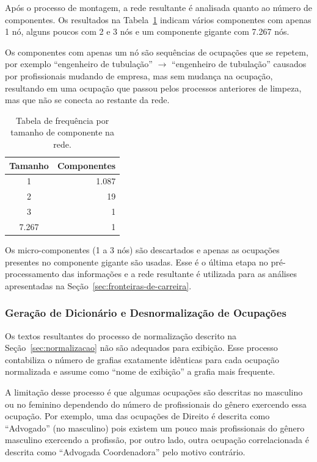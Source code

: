 \documentclass[12pt,a4paper]{article}
\begin{document}
Após o processo de montagem, a rede resultante é analisada quanto ao número de componentes. Os resultados na Tabela~\ref{tab:componentes} indicam vários componentes com apenas 1 nó, alguns poucos com 2 e 3 nós e um componente gigante com 7.267 nós.

Os componentes com apenas um nó são sequências de ocupações que se repetem, por exemplo \enquote{engenheiro de tubulação} $\to$ \enquote{engenheiro de tubulação} causados por profissionais mudando de empresa, mas sem mudança na ocupação, resultando em uma ocupação que passou pelos processos anteriores de limpeza, mas que não se conecta ao restante da rede.

\begin{table}[ht]
    \centering
    \begin{tabular}{@{} c r @{}}
        \toprule
        Tamanho & Componentes \\
        \midrule
        1        &  1.087 \\
        2        &  19 \\
        3        &  1 \\
        7.267 &  1 \\
        \bottomrule
    \end{tabular}
    \caption{Tabela de frequência por tamanho de componente na rede.}
    \label{tab:componentes}
\end{table}

Os micro-componentes (1 a 3 nós) são descartados e apenas as ocupações presentes no componente gigante são usadas. Esse é o última etapa no pré-processamento das informações e a rede resultante é utilizada para as análises apresentadas na Seção~\ref{sec:fronteiras-de-carreira}.


\subsubsection{Geração de Dicionário e Desnormalização de Ocupações} \label{sec:criar-dicionario}

Os textos resultantes do processo de normalização descrito na Seção~\ref{sec:normalizacao} não são adequados para exibição. Esse processo contabiliza o número de grafias exatamente idênticas para cada ocupação normalizada e assume como \enquote{nome de exibição} a grafia mais frequente.

A limitação desse processo é que algumas ocupações são descritas no masculino ou no feminino dependendo do número de profissionais do gênero exercendo essa ocupação. Por exemplo, uma das ocupações de Direito é descrita como \enquote{Advogado} (no masculino) pois existem um pouco mais profissionais do gênero masculino exercendo a profissão, por outro lado, outra ocupação correlacionada é descrita como \enquote{Advogada Coordenadora} pelo motivo contrário.
\end{document}
